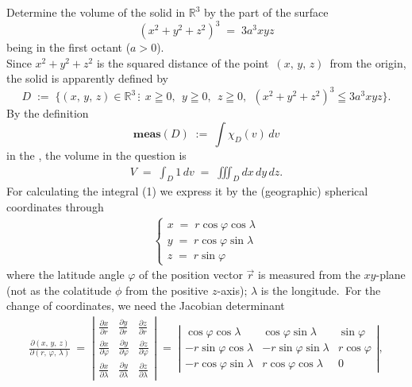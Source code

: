 \documentclass[12pt]{article}
\begin{document}
Determine the volume of the solid  in $\mathbb{R}^3$ by the part of the surface
$$(x^2\!+\!y^2\!+\!z^2)^3 \;=\; 3a^3xyz$$
being in the first octant ($a > 0$).\\


Since $x^2\!+\!y^2\!+\!z^2$ is the squared distance of the point \,$(x,\,y,\,z)$\, from the origin, the solid is apparently defined by
$$D \;:=\; 
\{(x,\,y,\,z)\in\mathbb{R}^3\,\vdots\;\, x \geqq 0,\;\, y \geqq 0,\;\, z \geqq 0,\;\, 
(x^2\!+\!y^2\!+\!z^2)^3 \leqq 3a^3xyz\}.$$
By the definition
$$\mathbf{meas}(D) \;:=\: \int \chi_D(v)\, dv$$
in the , the volume in the question
is
\begin{align}
V \;=\; \int_D1\,dv \;=\; \iiint_D dx\,dy\,dz.
\end{align}
For calculating the integral (1) we express it by the (geographic) spherical coordinates through
\begin{align*}
\begin{cases}
x \;=\; r\cos\varphi\cos\lambda\\
y \;=\; r\cos\varphi\sin\lambda\\
z \;=\; r\sin\varphi
\end{cases}
\end{align*}
where the latitude angle $\varphi$ of the position vector $\vec{r}$ is measured from the $xy$-plane (not as the colatitude $\phi$ from the positive $z$-axis); $\lambda$ is the longitude.\, For the change of coordinates, we need the Jacobian determinant
\begin{align*}
\frac{\partial(x,\,y,\,z)}{\partial(r,\,\varphi,\,\lambda)} \:=\;
 \left| \begin{matrix}
\frac{\partial x}{\partial r} & \frac{\partial y}{\partial r} & \frac{\partial z}{\partial r} \\
\frac{\partial x}{\partial \varphi} & \frac{\partial y}{\partial \varphi} & \frac{\partial z}{\partial \varphi} \\
\frac{\partial x}{\partial \lambda} & \frac{\partial y}{\partial \lambda} & \frac{\partial z}{\partial \lambda}
\end{matrix}\right| \;=\; 
 \left| \begin{matrix}
\cos\varphi\cos\lambda & \cos\varphi\sin\lambda & \sin\varphi \\
-r\sin\varphi\cos\lambda & -r\sin\varphi\sin\lambda & r\cos\varphi \\
-r\cos\varphi\sin\lambda & r\cos\varphi\cos\lambda & 0
\end{matrix}\right|,
\end{align*}
\end{document}
